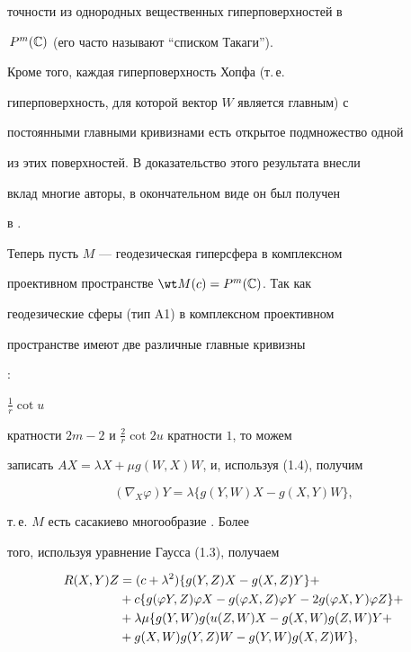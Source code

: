 точности из однородных вещественных гиперповерхностей в


$\,P^m(\Bbb C)$ (его часто называют ``списком Такаги'').


Кроме того, каждая гиперповерхность Хопфа (т.\,е.


гиперповерхность, для которой вектор $W$ является главным) с


постоянными главными кривизнами есть открытое подмножество одной


из этих поверхностей. В доказательство этого результата внесли


вклад многие авторы, в окончательном виде он был получен


в \cite{Kimura}.





Теперь пусть $M$ --- геодезическая гиперсфера в комплексном


проективном пространстве $\wt M(c)=P^m(\Bbb C)$. Так как


геодезические сферы (тип A1) в комплексном проективном


пространстве имеют две различные главные кривизны


\cite{CecilRyan}:


$\frac{1}{r}\cot u$


кратности $2m-2$ и $\frac{2}{r}\cot 2u$ кратности $1$, то можем


записать $AX=\lambda X+\mu g(W,X)W$, и, используя (1.4), получим


$$


(\nabla _X\varphi)Y=\lambda\{g(Y,W)X-g(X,Y)W\},


$$


т.\,е. $M$ есть сасакиево многообразие \cite{Blair}. Более


того, используя уравнение Гаусса (1.3), получаем


\begin{align*}


R(X,Y)Z&=(c+\lambda^2)\{g(Y,Z)X-g(X,Z)Y\}+ \\ \notag


&+c\{g(\varphi Y,Z)\varphi X


-g(\varphi X,Z)\varphi Y


-2g(\varphi X,Y)\varphi Z\}+ \\


&+\lambda\mu\{g(Y,W)g(u(Z,W)X-g(X,W)g(Z,W)Y+ \\


&+g(X,W)g(Y,Z)W-g(Y,W)g(X,Z)W\},


\end{align*}


